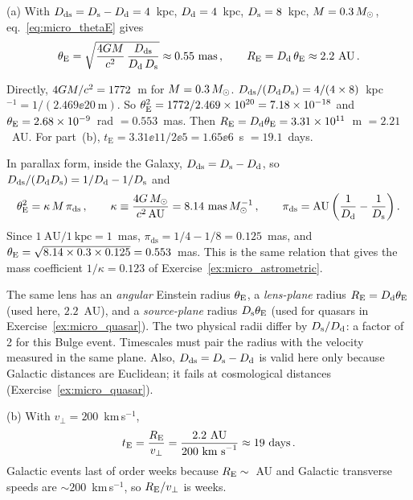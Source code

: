 (a) With $D_{\mathrm{ds}} = D_{\mathrm{s}} - D_{\mathrm{d}} = 4$~kpc, $D_{\mathrm{d}} = 4$~kpc, $D_{\mathrm{s}} = 8$~kpc,
$M = 0.3\,M_{\odot}$, eq.~\eqref{eq:micro_thetaE} gives
\begin{equation*}
    \theta_{\mathrm{E}} = \sqrt{\frac{4G M}{c^2}\,
    \frac{D_{\mathrm{ds}}}{D_{\mathrm{d}}\,D_{\mathrm{s}}}} \approx 0.55~\text{mas} \,,
    \qquad
    R_{\mathrm{E}} = D_{\mathrm{d}}\,\theta_{\mathrm{E}} \approx 2.2~\text{AU} \,.
\end{equation*}

\begin{derivation}
Directly, $4G M/c^2 = 1772$~m for $M = 0.3\,M_{\odot}$.
$D_{\mathrm{ds}}/(D_{\mathrm{d}}D_{\mathrm{s}}) = 4/(4\times8)$~kpc$^{-1} = 1/(2.469\ee{20}~\text{m})$.  So
$\theta_{\mathrm{E}}^2 = 1772/2.469\times 10^{20} = 7.18\times 10^{-18}$ and
$\theta_{\mathrm{E}} = 2.68\times 10^{-9}$~rad $= 0.553$~mas.  Then
$R_{\mathrm{E}} = D_{\mathrm{d}}\theta_{\mathrm{E}} = 3.31\times 10^{11}$~m $= 2.21$~AU.  For part~(b),
$t_{\mathrm E} = 3.31\ee{11}/2\ee{5} = 1.65\ee{6}$~s $= 19.1$~days.

In parallax form, inside the Galaxy, $D_{\mathrm{ds}} = D_{\mathrm{s}} - D_{\mathrm{d}}$, so
$D_{\mathrm{ds}}/(D_{\mathrm{d}}D_{\mathrm{s}}) = 1/D_{\mathrm{d}} - 1/D_{\mathrm{s}}$ and
\begin{equation*}
    \theta_{\mathrm{E}}^2 = \kappa\,M\,\pi_{\mathrm{ds}}\,,\qquad
    \kappa \equiv \frac{4G\,M_{\odot}}{c^2\,\mathrm{AU}}
    = 8.14~\text{mas}\,M_{\odot}^{-1}\,,\qquad
    \pi_{\mathrm{ds}} = \mathrm{AU}\left(\frac1{D_{\mathrm{d}}} - \frac1{D_{\mathrm{s}}}\right).
\end{equation*}
Since $1~\mathrm{AU}/1~\mathrm{kpc} = 1$~mas,
$\pi_{\mathrm{ds}} = 1/4 - 1/8 = 0.125$~mas, and
$\theta_{\mathrm{E}} = \sqrt{8.14\times0.3\times0.125} = 0.553$~mas.  This is the same
relation that gives the mass coefficient $1/\kappa = 0.123$ of
Exercise~\ref{ex:micro_astrometric}.
\end{derivation}

\begin{annotation}
The same lens has an \emph{angular} Einstein radius $\theta_{\mathrm{E}}$, a
\emph{lens-plane} radius $R_{\mathrm{E}} = D_{\mathrm{d}}\theta_{\mathrm{E}}$ (used here, $2.2$~AU), and a
\emph{source-plane} radius $D_{\mathrm{s}}\theta_{\mathrm{E}}$ (used for quasars in
Exercise~\ref{ex:micro_quasar}).  The two physical radii differ by
$D_{\mathrm{s}}/D_{\mathrm{d}}$: a factor of 2 for this Bulge event.  Timescales must pair the
radius with the velocity measured in the same plane.  Also,
$D_{\mathrm{ds}} = D_{\mathrm{s}} - D_{\mathrm{d}}$ is valid here only because Galactic distances are
Euclidean; it fails at cosmological distances (Exercise~\ref{ex:micro_quasar}).
\end{annotation}

(b) With $v_\perp = 200$~km\,s$^{-1}$,
\begin{equation*}
    t_{\mathrm{E}} = \frac{R_{\mathrm{E}}}{v_\perp}
    = \frac{2.2~\text{AU}}{200~\text{km s}^{-1}}
    \approx 19~\text{days} \,.
\end{equation*}
Galactic events last of order weeks because $R_{\mathrm{E}}\sim$~AU and Galactic
transverse speeds are $\sim\!200$~km\,s$^{-1}$, so $R_{\mathrm{E}}/v_\perp$ is weeks.

